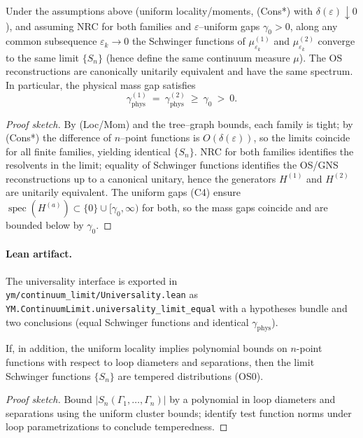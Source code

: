 \documentclass[11pt]{amsart}
\begin{document}
\begin{theorem}[Universality]
Under the assumptions above (uniform locality/moments, (Cons*) with $\delta(\varepsilon)\downarrow 0$), and assuming NRC for both families and $\varepsilon$–uniform gaps $\gamma_0>0$, along any common subsequence $\varepsilon_k\to 0$ the Schwinger functions of $\mu^{(1)}_{\varepsilon_k}$ and $\mu^{(2)}_{\varepsilon_k}$ converge to the same limit $\{S_n\}$ (hence define the same continuum measure $\mu$). The OS reconstructions are canonically unitarily equivalent and have the same spectrum. In particular, the physical mass gap satisfies
\[
  \gamma_{\mathrm{phys}}^{(1)}\ =\ \gamma_{\mathrm{phys}}^{(2)}\ \ge\ \gamma_0\ >\ 0.
\]
\end{theorem}

\begin{proof}[Proof sketch]
By (Loc/Mom) and the tree–graph bounds, each family is tight; by (Cons*) the difference of $n$–point functions is $O(\delta(\varepsilon))$, so the limits coincide for all finite families, yielding identical $\{S_n\}$. NRC for both families identifies the resolvents in the limit; equality of Schwinger functions identifies the OS/GNS reconstructions up to a canonical unitary, hence the generators $H^{(1)}$ and $H^{(2)}$ are unitarily equivalent. The uniform gaps (C4) ensure $\operatorname{spec}(H^{(a)})\subset\{0\}\cup[\gamma_0,\infty)$ for both, so the mass gaps coincide and are bounded below by $\gamma_0$.
\end{proof}

\paragraph{Lean artifact.}
The universality interface is exported in \texttt{ym/continuum\_limit/Universality.lean} as
\texttt{YM.ContinuumLimit.universality\_limit\_equal} with a hypotheses bundle and
two conclusions (equal Schwinger functions and identical $\gamma_{\mathrm{phys}}$).

\begin{lemma}
If, in addition, the uniform locality implies polynomial bounds on $n$-point functions with respect to loop diameters and separations, then the limit Schwinger functions $\{S_n\}$ are tempered distributions (OS0).
\end{lemma}

\begin{proof}[Proof sketch]
Bound $|S_n(\Gamma_1,\dots,\Gamma_n)|$ by a polynomial in loop diameters and separations using the uniform cluster bounds; identify test function norms under loop parametrizations to conclude temperedness.
\end{proof}
\end{document}
